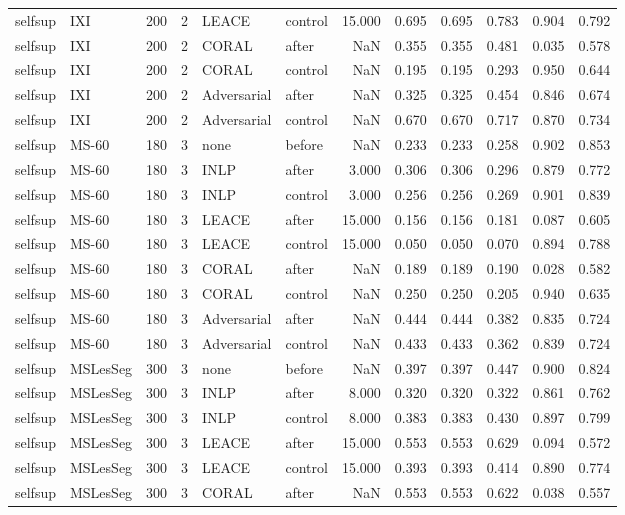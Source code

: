 \begin{tabular}{llrrllrrrrrr}
selfsup & IXI & 200 & 2 & LEACE & control & 15.000 & 0.695 & 0.695 & 0.783 & 0.904 & 0.792 \\
selfsup & IXI & 200 & 2 & CORAL & after & NaN & 0.355 & 0.355 & 0.481 & 0.035 & 0.578 \\
selfsup & IXI & 200 & 2 & CORAL & control & NaN & 0.195 & 0.195 & 0.293 & 0.950 & 0.644 \\
selfsup & IXI & 200 & 2 & Adversarial & after & NaN & 0.325 & 0.325 & 0.454 & 0.846 & 0.674 \\
selfsup & IXI & 200 & 2 & Adversarial & control & NaN & 0.670 & 0.670 & 0.717 & 0.870 & 0.734 \\
selfsup & MS-60 & 180 & 3 & none & before & NaN & 0.233 & 0.233 & 0.258 & 0.902 & 0.853 \\
selfsup & MS-60 & 180 & 3 & INLP & after & 3.000 & 0.306 & 0.306 & 0.296 & 0.879 & 0.772 \\
selfsup & MS-60 & 180 & 3 & INLP & control & 3.000 & 0.256 & 0.256 & 0.269 & 0.901 & 0.839 \\
selfsup & MS-60 & 180 & 3 & LEACE & after & 15.000 & 0.156 & 0.156 & 0.181 & 0.087 & 0.605 \\
selfsup & MS-60 & 180 & 3 & LEACE & control & 15.000 & 0.050 & 0.050 & 0.070 & 0.894 & 0.788 \\
selfsup & MS-60 & 180 & 3 & CORAL & after & NaN & 0.189 & 0.189 & 0.190 & 0.028 & 0.582 \\
selfsup & MS-60 & 180 & 3 & CORAL & control & NaN & 0.250 & 0.250 & 0.205 & 0.940 & 0.635 \\
selfsup & MS-60 & 180 & 3 & Adversarial & after & NaN & 0.444 & 0.444 & 0.382 & 0.835 & 0.724 \\
selfsup & MS-60 & 180 & 3 & Adversarial & control & NaN & 0.433 & 0.433 & 0.362 & 0.839 & 0.724 \\
selfsup & MSLesSeg & 300 & 3 & none & before & NaN & 0.397 & 0.397 & 0.447 & 0.900 & 0.824 \\
selfsup & MSLesSeg & 300 & 3 & INLP & after & 8.000 & 0.320 & 0.320 & 0.322 & 0.861 & 0.762 \\
selfsup & MSLesSeg & 300 & 3 & INLP & control & 8.000 & 0.383 & 0.383 & 0.430 & 0.897 & 0.799 \\
selfsup & MSLesSeg & 300 & 3 & LEACE & after & 15.000 & 0.553 & 0.553 & 0.629 & 0.094 & 0.572 \\
selfsup & MSLesSeg & 300 & 3 & LEACE & control & 15.000 & 0.393 & 0.393 & 0.414 & 0.890 & 0.774 \\
selfsup & MSLesSeg & 300 & 3 & CORAL & after & NaN & 0.553 & 0.553 & 0.622 & 0.038 & 0.557 \\

\end{tabular}

